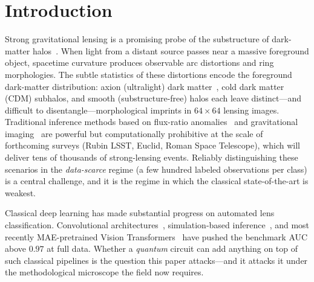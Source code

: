 \documentclass[10pt,letterpaper]{article}
\theoremstyle{plain}
\theoremstyle{definition}
\begin{document}
\begin{abstract}
representative low-$N$ cells this win is \emph{statistically significant}
($n{=}10$, Holm $p{=}0.003$, $10/10$ seed-paired, $+22$--$28$ AUC points), using
$1/19$ the parameters and \emph{zero} pretraining data.
We are explicit that the quantum contribution stays \emph{below} our own $3\%$
practical-significance bar, that the paradigm win belongs to the CNN
inductive-bias family rather than to the circuit, and we report the negative
results---wide-readout regression at mid-$N$, non-transferring qubit scaling, a
dead circuit-learning-rate lever, and topological-feature and raw-pixel quantum
failures---that bound the claim.
To our knowledge this is the most controlled characterization of where a small
quantum circuit does, and does not, help on gravitational-lensing classification.
\end{abstract}

\section{Introduction}
\label{sec:intro}

Strong gravitational lensing is a promising probe of the substructure of
dark-matter halos~\cite{hezaveh2017fast,alexander2020deep}.
When light from a distant source passes near a massive foreground object,
spacetime curvature produces observable arc distortions and ring morphologies.
The subtle statistics of these distortions encode the foreground dark-matter
distribution: axion (ultralight) dark matter~\cite{hui2017ultralight},
cold dark matter (CDM) subhalos, and smooth (substructure-free) halos each leave
distinct---and difficult to disentangle---morphological imprints in
$64\times64$ lensing images.
Traditional inference methods based on flux-ratio
anomalies~\cite{dalal2002detecting} and gravitational
imaging~\cite{brehmer2019mining} are powerful but computationally prohibitive at
the scale of forthcoming surveys (Rubin LSST, Euclid, Roman Space Telescope),
which will deliver tens of thousands of strong-lensing events.
Reliably distinguishing these scenarios in the \emph{data-scarce} regime
(a few hundred labeled observations per class) is a central challenge, and it is
the regime in which the classical state-of-the-art is weakest.

Classical deep learning has made substantial progress on automated lens
classification. Convolutional
architectures~\cite{hezaveh2017fast,lanusse2018cmu,alexander2020deep},
simulation-based inference~\cite{brehmer2019mining}, and most recently
MAE-pretrained Vision Transformers~\cite{prasha2025masked} have pushed the
benchmark AUC above $0.97$ at full data.
Whether a \emph{quantum} circuit can add anything on top of such classical
pipelines is the question this paper attacks---and it attacks it under the
methodological microscope the field now requires.
\end{document}

